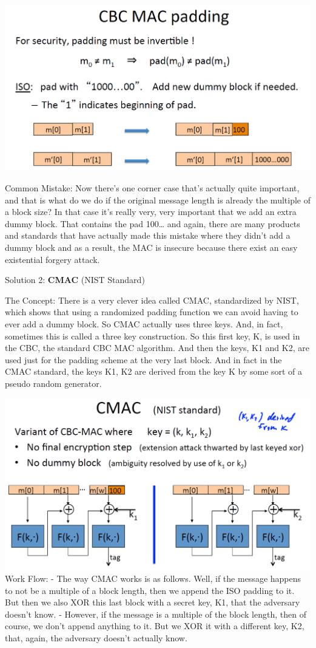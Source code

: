 \documentclass[11pt]{article}
\makeatletter
\def\maxwidth{\ifdim\Gin@nat@width>\linewidth\linewidth
    \else\Gin@nat@width\fi}
\let\Oldincludegraphics\includegraphics
\renewcommand{\includegraphics}[1]{\Oldincludegraphics[width=.8\maxwidth]{#1}}
\makeatother
\begin{document}
\includegraphics{./Images/CBC-ISOPadding.png}

Common Mistake: Now there's one corner case that's actually quite
important, and that is what do we do if the original message length is
already the multiple of a block size? In that case it's really very,
very important that we add an extra dummy block. That contains the pad
100\ldots{} and again, there are many products and standards that have
actually made this mistake where they didn't add a dummy block and as a
result, the MAC is insecure because there exist an easy existential
forgery attack.

Solution 2: \textbf{CMAC} (NIST Standard)

The Concept: There is a very clever idea called CMAC, standardized by
NIST, which shows that using a randomized padding function we can avoid
having to ever add a dummy block. So CMAC actually uses three keys. And,
in fact, sometimes this is called a three key construction. So this
first key, K, is used in the CBC, the standard CBC MAC algorithm. And
then the keys, K1 and K2, are used just for the padding scheme at the
very last block. And in fact in the CMAC standard, the keys K1, K2 are
derived from the key K by some sort of a pseudo random generator.

\includegraphics{./Images/CMAC.png} Work Flow: - The way CMAC works is
as follows. Well, if the message happens to not be a multiple of a block
length, then we append the ISO padding to it. But then we also XOR this
last block with a secret key, K1, that the adversary doesn't know. -
However, if the message is a multiple of the block length, then of
course, we don't append anything to it. But we XOR it with a different
key, K2, that, again, the adversary doesn't actually know.
\end{document}
